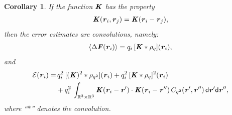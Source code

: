 \documentclass[aps,pre,preprint]{revtex4}
\renewcommand{\v}[1]{\textbf{\textit{#1}}}
\renewcommand{\d}[1]{\textsf{#1}}
\newtheorem{corollary}[theorem]{Corollary}
\begin{document}
\begin{corollary}\label{thm:tmp2}
  If the function $\v K$ has the property
  \begin{align}
    \label{eqn:cor-kernel}
    \v K(\v r_i,\v r_j) = \v K(\v r_i - \v r_j),    
  \end{align}
  then the error estimates are convolutions, namely:
  \begin{align}\label{eqn:cor-meanf}
    \langle\Delta\v F(\v r_i)\rangle
    =q_i\, [\v K\ast\rho_q](\v r_i),
  \end{align}
  and 
  \begin{align}\nonumber
    \mathcal E (\v r_i) 
    = &\,
    q_i^2\,[(\v K)^2\ast\rho_{q^2}] (\v r_i) + 
    q_i^2\,[\v K\ast\rho_{q}]^2 (\v r_i) \\\label{eqn:cor-error}
    &+
    q_i^2\,\int_{\mathbb R^3\times\mathbb R^3}
    \v K(\v r_i-\v r')\cdot
    \v K(\v r_i-\v r'')\,
    C_{q^2}(\v r', \v r'')\,
    \d d\v r'\d d\v r'',
  \end{align}
  where ``$\ast$'' denotes the convolution.
\end{corollary}
\end{document}
